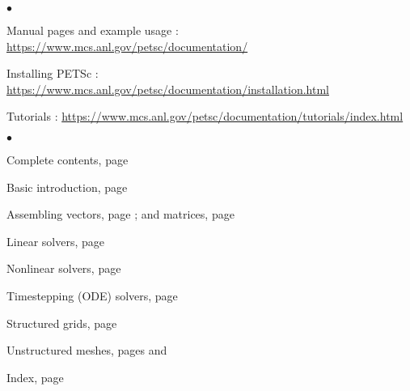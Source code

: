 
%

\medskip\medskip


\medskip


\begin{list}{$\bullet$}
{
\setlength{\itemsep}{-.020in}
\setlength{\topsep}{0in}
\setlength{\partopsep}{0in}
}
\item Manual pages and example usage :
\href{https://www.mcs.anl.gov/petsc/documentation/}{https://www.mcs.anl.gov/petsc/documentation/}
\item Installing PETSc :
\href{https://www.mcs.anl.gov/petsc/documentation/installation.html}{https://www.mcs.anl.gov/petsc/documentation/installation.html}
\item Tutorials : \href{https://www.mcs.anl.gov/petsc/documentation/tutorials/index.html}{https://www.mcs.anl.gov/petsc/documentation/tutorials/index.html} 
\end{list}

\medskip
{}
\begin{list}{$\bullet$}
{
\setlength{\itemsep}{-.02in}
\setlength{\topsep}{.02in}
\setlength{\partopsep}{0in}
}
\item Complete contents, page \pageref{tableofcontents}
\item Basic introduction, page \pageref{sec_gettingstarted}
\item Assembling vectors, page \pageref{sec_vecbasic}; and matrices, page \pageref{chapter_matrices}
\item Linear solvers, page \pageref{ch_ksp}
\item Nonlinear solvers, page \pageref{chapter_snes}
\item Timestepping (ODE) solvers, page \pageref{chapter_ts}
\item Structured grids, page \pageref{sec_struct} 
\item Unstructured meshes, pages \pageref{sec_unstruct} and \pageref{ch_unstructured}
\item Index, page \pageref{ch_index}
\end{list}

